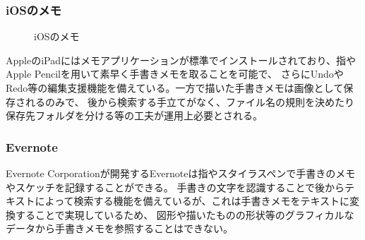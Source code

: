 \subsubsection{iOSのメモ}

\begin{figure}[htbp]
    \begin{center}
         \end{center}
    \caption{iOSのメモ}
\end{figure}

AppleのiPadにはメモアプリケーションが標準でインストールされており、指やApple Pencilを用いて素早く手書きメモを取ることを可能で、
さらにUndoやRedo等の編集支援機能を備えている。一方で描いた手書きメモは画像として保存されるのみで、
後から検索する手立てがなく、ファイル名の規則を決めたり保存先フォルダを分ける等の工夫が運用上必要とされる。

\subsubsection{Evernote}


Evernote Corporationが開発するEvernoteは指やスタイラスペンで手書きのメモやスケッチを記録することができる。
手書きの文字を認識することで後からテキストによって検索する機能を備えているが、これは手書きメモをテキストに変換することで実現しているため、
図形や描いたものの形状等のグラフィカルなデータから手書きメモを参照することはできない。

